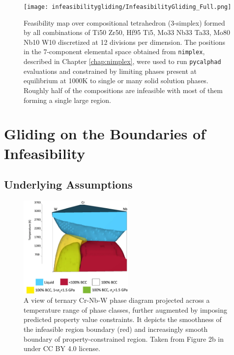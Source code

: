 \begin{figure}[H]
    \centering
    \texttt{[image: infeasibilitygliding/InfeasibilityGliding\_Full.png]}
    \caption{Feasibility map over compositional tetrahedron (3-simplex) formed by all combinations of Ti50 Zr50, Hf95 Ti5, Mo33 Nb33 Ta33, Mo80 Nb10 W10 discretized at 12 divisions per dimension. The positions in the 7-component elemental space obtained from \texttt{nimplex}, described in Chapter \ref{chap:nimplex}, were used to run \texttt{pycalphad} \cite{Otis2017Pycalphad:Python} evaluations and constrained by limiting phases present at equilibrium at 1000K to single or many solid solution phases. Roughly half of the compositions are infeasible with most of them forming a single large region.}
    \label{infeasibilitygliding:fig:fullcomputation}
\end{figure}



\section{Gliding on the Boundaries of Infeasibility} \label{infglide:sec:glide}

\subsection{Underlying Assumptions} \label{infglide:ssec:assumptions}

\todo

\begin{figure}[H]
    \centering
    \includegraphics[width=0.5\textwidth]{infeasibilitygliding/PhaseTernaryMap_Elder2023.png}
    \caption{A view of ternary Cr-Nb-W phase diagram projected across a temperature range of phase classes, further augmented by imposing predicted property value constraints. It depicts the smoothness of the infeasible region boundary (red) and increasingly smooth boundary of property-constrained region. Taken from Figure 2b in \citet{Elder2023ComputationalValidation} under CC BY 4.0 license.}
    \label{infeasibilitygliding:fig:katesphasemap}
\end{figure}


